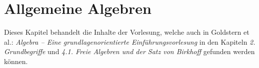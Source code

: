 \chapter{Allgemeine Algebren}

Dieses Kapitel behandelt die Inhalte der Vorlesung, welche auch in Goldstern et al.: \textit{Algebra -- Eine grundlagenorientierte Einführungsvorlesung} in den Kapiteln \textit{2. Grundbegriffe} und \textit{4.1. Freie Algebren und der Satz von Birkhoff} gefunden werden können.





